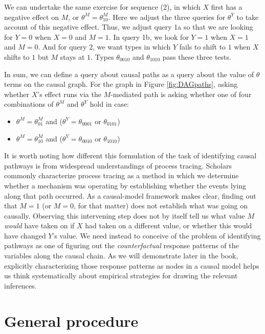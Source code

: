 \documentclass[
  12pt,
]{book}
\providecommand{\tightlist}{%
  \setlength{\itemsep}{0pt}\setlength{\parskip}{0pt}}
\begin{document}
We can undertake the same exercise for sequence (2), in which \(X\) first has a negative effect on \(M\), or \(\theta^M=\theta^M_{10}\). Here we adjust the three queries for \(\theta^Y\) to take account of this negative effect. Thus, we adjust query 1a so that we are looking for \(Y=0\) when \(X=0\) and \(M=1\). In query 1b, we look for \(Y=1\) when \(X=1\) and \(M=0\). And for query 2, we want types in which \(Y\) fails to shift to \(1\) when \(X\) shifts to \(1\) but \(M\) stays at \(1\). Types \(\theta_{0010}\) and \(\theta_{1010}\) pass these three tests.

In sum, we can define a query about causal paths as a query about the value of \(\theta\) terms on the causal graph. For the graph in Figure \ref{fig:DAGpaths}, asking whether \(X\)'s effect runs via the \(M\)-mediated path is asking whether one of four combinations of \(\theta^M\) and \(\theta^Y\) hold in case:

\begin{itemize}
\tightlist
\item
  \(\theta^M=\theta^M_{01}\) and (\(\theta^Y=\theta_{0001}\) or \(\theta_{0101}\))
\item
  \(\theta^M=\theta^M_{10}\) and (\(\theta^Y=\theta_{0010}\) or \(\theta_{1010}\))
\end{itemize}

It is worth noting how different this formulation of the task of identifying causal pathways is from widespread understandings of process tracing. Scholars commonly characterize process tracing as a method in which we determine whether a mechanism was operating by establishing whether the events lying along that path occurred. As a causal-model framework makes clear, finding out that \(M=1\) (or \(M=0\), for that matter) does not establish what was going on causally. Observing this intervening step does not by itself tell us what value \(M\) \emph{would} have taken on if \(X\) had taken on a different value, or whether this would have changed \(Y\)'s value. We need instead to conceive of the problem of identifying pathways as one of figuring out the \emph{counterfactual} response patterns of the variables along the causal chain. As we will demonstrate later in the book, explicitly characterizing those response patterns as nodes in a causal model helps us think systematically about empirical strategies for drawing the relevant inferences.

\hypertarget{general-procedure}{%
\section{General procedure}\label{general-procedure}}
\end{document}
